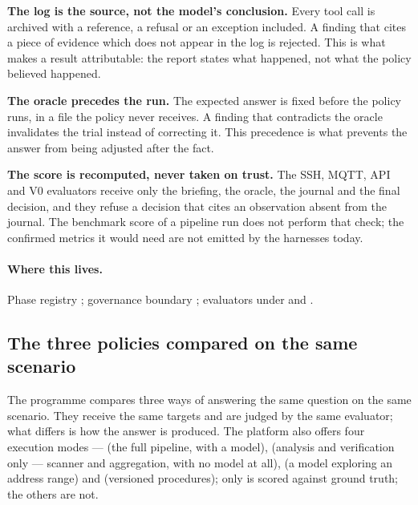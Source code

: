\textbf{The log is the source, not the model's conclusion.} Every tool call is
archived with a reference, a refusal or an exception included. A finding that
cites a piece of evidence which does not appear in the log is rejected. This is
what makes a result attributable: the report states what happened, not what the
policy believed happened.

\textbf{The oracle precedes the run.} The expected answer is fixed before the
policy runs, in a file the policy never receives. A finding that contradicts the
oracle invalidates the trial instead of correcting it. This precedence is what
prevents the answer from being adjusted after the fact.

\textbf{The score is recomputed, never taken on trust.} The SSH, MQTT, API and V0
evaluators receive only the briefing, the oracle, the journal and the final
decision, and they refuse a decision that cites an observation absent from the
journal. The benchmark score of a pipeline run does not perform that check; the
confirmed metrics it would need are not emitted by the harnesses today.
\paragraph{Where this lives.}
Phase registry ; governance boundary
; evaluators under  and
.

\subsection{The three policies compared on the same scenario}
\label{sec:politiques}

The programme compares three ways of answering the same question on the same
scenario. They receive the same targets and are judged by the same evaluator; what
differs is how the answer is produced. The platform also offers four execution
modes ---  (the full pipeline, with a model),  (analysis and
verification only --- scanner and aggregation, with no model at all),  (a
model exploring an address range) and  (versioned procedures); only
 is scored against ground truth; the others are not.

